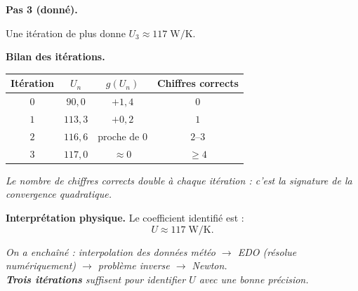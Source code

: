 \medskip

\textbf{Pas 3 (donné).}

\smallskip

Une itération de plus donne
$U_3 \approx 117\;\mathrm{W/K}$.

\medskip

\textbf{Bilan des itérations.}

\begin{center}
\renewcommand{\arraystretch}{1.3}
\begin{tabular}{c|c|c|c}
  Itération & $U_n$             & $g(U_n)$       & Chiffres corrects \\
  \hline
  $0$ & $90{,}0$             & $+1{,}4$       & $0$ \\
  $1$ & $113{,}3$            & $+0{,}2$       & $1$ \\
  $2$ & $116{,}6$            & proche de $0$  & $2$--$3$ \\
  $3$ & $117{,}0$            & $\approx 0$    & $\geq 4$ \\
\end{tabular}
\end{center}

\medskip

\textit{Le nombre de chiffres corrects double
à chaque itération : c'est la signature
de la convergence quadratique.}


\medskip

\textbf{Interprétation physique.}
Le coefficient identifié est :
\[
  \boxed{U \approx 117\;\mathrm{W/K}.}
\]


\medskip

\begin{center}
\begin{mdframed}[backgroundcolor=ThemeLight, linecolor=Theme,
  linewidth=1pt, innertopmargin=8pt, innerbottommargin=8pt]
\centering\itshape
On a enchaîné : interpolation des données météo
$\to$ EDO (résolue numériquement) $\to$ problème inverse
$\to$ Newton.\\
\textbf{Trois itérations} suffisent pour identifier $U$
avec une bonne précision.
\end{mdframed}
\end{center}

